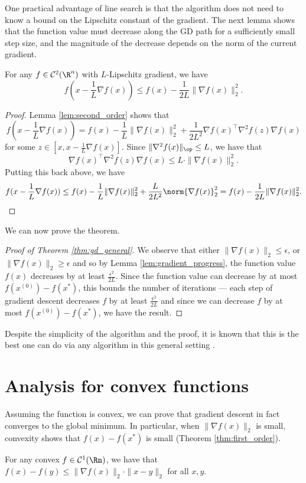 One practical advantage of line search is that the algorithm does
not need to know a bound on the Lipschitz constant of the gradient.
The next lemma shows that the function value must decrease along the
GD path for a sufficiently small step size, and the magnitude of the
decrease depends on the norm of the current gradient.
\begin{lem}
\label{lem:gradient_progress}For any $f\in\mathcal{C}^{2}(\R^{n})$
with $L$-Lipschitz gradient, we have
\[
f(x-\frac{1}{L}\nabla f(x))\leq f(x)-\frac{1}{2L}\|\nabla f(x)\|_{2}^{2}.
\]
\end{lem}

\begin{proof}
Lemma \ref{lem:second_order} shows that 
\[
f(x-\frac{1}{L}\nabla f(x))=f(x)-\frac{1}{L}\|\nabla f(x)\|_{2}^{2}+\frac{1}{2L^{2}}\nabla f(x)^{\top}\nabla^{2}f(z)\nabla f(x)
\]
for some $z\in[x,x-\frac{1}{L}\nabla f(x)]$. Since $\|\nabla^{2}f(x)\|_{\op}\leq L$,
we have that 
\[
\nabla f(x)^{\top}\nabla^{2}f(z)\nabla f(x)\leq L\cdot\|\nabla f(x)\|_{2}^{2}.
\]
Putting this back above, we have 
\[
f(x-\frac{1}{L}\nabla f(x))\le f(x)-\frac{1}{L}\|\nabla f(x)\|_{2}^{2}+\frac{L}{2L^{2}}\norm{\nabla f(x)}_{2}^{2}=f(x)-\frac{1}{2L}\|\nabla f(x)\|_{2}^{2}.
\]
\end{proof}
We can now prove the theorem. 
\begin{proof}[Proof of Theorem \ref{thm:gd_general}]
 We observe that either $\|\nabla f(x)\|_{2}\le\epsilon$, or $\|\nabla f(x)\|_{2}\geq\epsilon$
and so by Lemma \ref{lem:gradient_progress}, the function value $f(x)$
decreases by at least $\frac{\epsilon^{2}}{2L}$. Since the function
value can decrease by at most $f(x^{(0)})-f(x^{*})$, this bounds
the number of iterations --- each step of gradient descent decreases
$f$ by at least $\frac{\epsilon^{2}}{2L}$ and since we can decrease
$f$ by at most $f(x^{(0)})-f(x^{*})$, we have the result.
\end{proof}
Despite the simplicity of the algorithm and the proof, it is known
that this is the best one can do via any algorithm in this general
setting \cite{carmon2017lower}.

\section{Analysis for convex functions}

Assuming the function is convex, we can prove that gradient descent
in fact converges to the global minimum. In particular, when $\|\nabla f(x)\|_{2}$
is small, convexity shows that $f(x)-f(x^{*})$ is small (Theorem
\ref{thm:first_order}).
\begin{lem}
\label{lem:f_diff_diameter}For any convex $f\in\mathcal{C}^{1}(\Rn)$,
we have that $f(x)-f(y)\leq\|\nabla f(x)\|_{2}\cdot\|x-y\|_{2}$ for
all $x,y$.
\end{lem}

